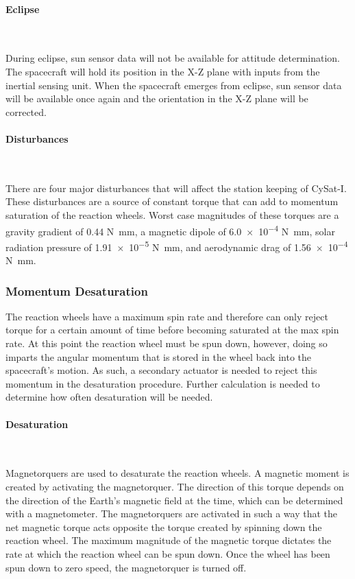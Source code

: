 \documentclass[12pt]{article}
\begin{document}
\paragraph{Eclipse} \

During eclipse, sun sensor data will not be available for attitude determination. The spacecraft will hold its position in the X-Z plane with inputs from the inertial sensing unit. When the spacecraft emerges from eclipse, sun sensor data will be available once again and the orientation in the X-Z plane will be corrected.

\paragraph{Disturbances} \

There are four major disturbances that will affect the station keeping of CySat-I. These disturbances are a source of constant torque that can add to momentum saturation of the reaction wheels. Worst case magnitudes of these torques are a gravity gradient of 0.44 \si{\newton\milli\meter}, a magnetic dipole of \num{6.0 e-4} \si{\newton\milli\meter}, solar radiation pressure of \num{1.91 e-5} \si{\newton\milli\meter}, and aerodynamic drag of \num{1.56 e-4} \si{\newton\milli\meter}.

\subsubsection{Momentum Desaturation}

The reaction wheels have a maximum spin rate and therefore can only reject torque for a certain amount of time before becoming saturated at the max spin rate. At this point the reaction wheel must be spun down, however, doing so imparts the angular momentum that is stored in the wheel back into the spacecraft’s motion. As such, a secondary actuator is needed to reject this momentum in the desaturation procedure. Further calculation is needed to determine how often desaturation will be needed.

\paragraph{Desaturation} \

Magnetorquers are used to desaturate the reaction wheels. A magnetic moment is created by activating the magnetorquer. The direction of this torque depends on the direction of the Earth’s magnetic field at the time, which can be determined with a magnetometer. The magnetorquers are activated in such a way that the net magnetic torque acts opposite the torque created by spinning down the reaction wheel. The maximum magnitude of the magnetic torque dictates the rate at which the reaction wheel can be spun down. Once the wheel has been spun down to zero speed, the magnetorquer is turned off. 
\end{document}
